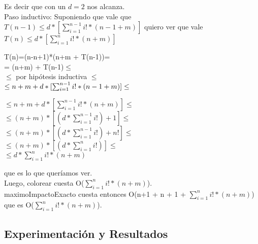 \indent Es decir que con un $d=2$ nos alcanza.\\


\indent Paso inductivo: Suponiendo que vale que $T(n-1) \leq d * [\sum_{i=1}^{n-1} i! * (n-1+m)] $ quiero ver que vale $T(n) \leq d * [\sum_{i=1}^{n} i! * (n+m)] $ \\


\begin{center}
T(n)=(n-n+1)*(n+m + T(n-1))=\\

= (n+m) + T(n-1)$\leq$\\

$\leq$ por hipótesis inductiva $\leq$\\

$\leq n+m + d * [\sum_{i=1}^{n-1} i! * (n-1+m)] \leq \\$

$\leq n+m + d * [\sum_{i=1}^{n-1} i! * (n+m)] \leq$ \\

$\leq (n+m) *[ (d* \sum_{i=1}^{n-1} i!) + 1] \leq$ \\

$\leq (n+m) *[ (d* \sum_{i=1}^{n-1} i!) + n!] \leq$ \\

$\leq (n+m) *[ (d* \sum_{i=1}^{n} i!)] \leq$\\

$\leq  d* \sum_{i=1}^{n} i!*(n+m)$\\

\end{center}

\indent que es lo que queríamos ver.\\

\indent Luego, colorear cuesta O($\sum_{i=1}^{n} i! * (n+m) $).\\

\indent maximoImpactoExacto cuesta entonces O(n+1 + n + 1 + $\sum_{i=1}^{n} i! * (n+m) $) que es O($\sum_{i=1}^{n} i! * (n+m) $).\\

\subsection{Experimentación y Resultados}

